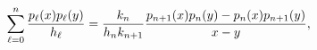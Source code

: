 \[\sum_{\ell=0}^{n}\frac{p_{\ell}(x)p_{\ell}(y)}{h_{\ell}}=\frac{k_{n}}{h_{n}k_{%
n+1}}\frac{p_{n+1}(x)p_{n}(y)-p_{n}(x)p_{n+1}(y)}{x-y},\]